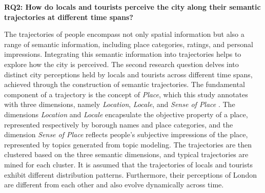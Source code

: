 \documentclass{article}
\theoremstyle{remark}
\begin{document}
\textbf{RQ2: How do locals and tourists perceive the city along their semantic trajectories at different time spans?}

The trajectories of people encompass not only spatial information but also a range of semantic information, including place categories, ratings, and personal impressions. Integrating this semantic information into trajectories helps to explore how the city is perceived. The second research question delves into distinct city perceptions held by locals and tourists across different time spans, achieved through the construction of semantic trajectories. The fundamental component of a trajectory is the concept of \textit{Place}, which this study annotates with three dimensions, namely \textit{Location}, \textit{Locale}, and \textit{Sense of Place} \citep{agnew_space_2011}. The dimensions \textit{Location} and \textit{Locale} encapsulate the objective property of a place, represented respectively by borough names and place categories, and the dimension \textit{Sense of Place} reflects people's subjective impressions of the place, represented by topics generated from topic modeling. The trajectories are then clustered based on the three semantic dimensions, and typical trajectories are mined for each cluster. It is assumed that the trajectories of locals and tourists exhibit different distribution patterns. Furthermore, their perceptions of London are different from each other and also evolve dynamically across time.
\end{document}
